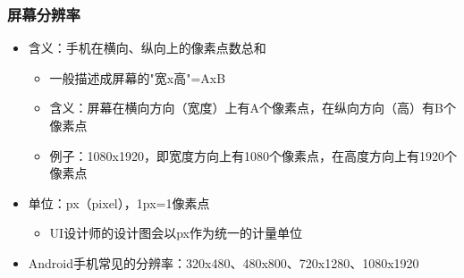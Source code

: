 \documentclass[9pt, b5paper]{article}
\begin{document}
\subsubsection{屏幕分辨率}
\label{sec-1-4-2}
\begin{itemize}
\item 含义：手机在横向、纵向上的像素点数总和
\begin{itemize}
\item 一般描述成屏幕的"宽x高"=AxB
\item 含义：屏幕在横向方向（宽度）上有A个像素点，在纵向方向（高）有B个像素点
\item 例子：1080x1920，即宽度方向上有1080个像素点，在高度方向上有1920个像素点
\end{itemize}
\item 单位：px（pixel），1px=1像素点
\begin{itemize}
\item UI设计师的设计图会以px作为统一的计量单位
\end{itemize}
\item Android手机常见的分辨率：320x480、480x800、720x1280、1080x1920
\end{itemize}
\end{document}
